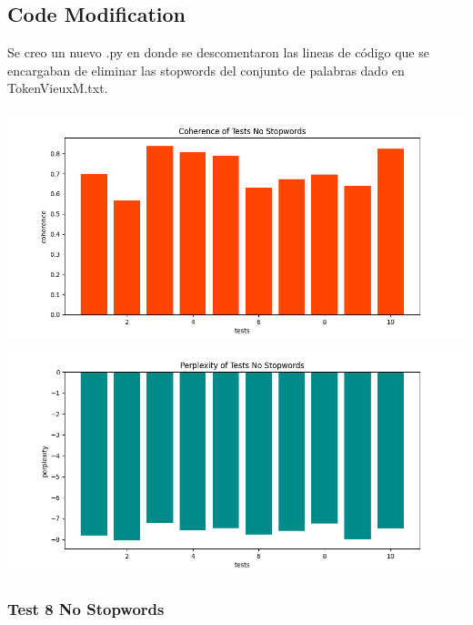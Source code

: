 \documentclass[10pt]{article} %
\begin{document}
	\subsection{Code Modification}
	
	Se creo un nuevo .py en donde se descomentaron las lineas de c\'odigo que se encargaban de eliminar las stopwords del conjunto de palabras dado en TokenVieuxM.txt.
	
	\begin{center}
		\includegraphics[scale=0.6]{images/coherence_no_stopwords}
		\includegraphics[scale=0.6]{images/perplexity_no_stopwords}
	\end{center}

	\subsubsection{Test 8 No Stopwords}
	
\end{document}
